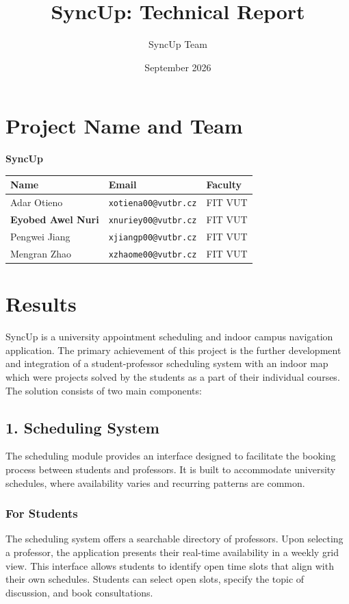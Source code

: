 \documentclass[12pt,a4paper]{article}
\title{\textbf{SyncUp: Technical Report}}
\author{SyncUp Team}
\date{September 2026}
\begin{document}
\maketitle

\section*{Project Name and Team}
\textbf{SyncUp}

\begin{table}[H]
    \centering
    \begin{tabular}{|l|l|l|}
        \hline
        \textbf{Name} & \textbf{Email} & \textbf{Faculty} \\
        \hline
        Adar Otieno & \texttt{xotiena00@vutbr.cz} & FIT VUT \\
        \textbf{Eyobed Awel Nuri} & \texttt{xnuriey00@vutbr.cz} & FIT VUT \\
        Pengwei Jiang & \texttt{xjiangp00@vutbr.cz} & FIT VUT \\
        Mengran Zhao & \texttt{xzhaome00@vutbr.cz} & FIT VUT \\
        \hline
    \end{tabular}
\end{table}

\section*{Results}
SyncUp is a university appointment scheduling and indoor campus navigation application. The primary achievement of this project is the further development and integration of a student-professor scheduling system with an indoor map which were projects solved by the students as a part of their individual courses. The solution consists of two main components:

\subsection*{1. Scheduling System}
The scheduling module provides an interface designed to facilitate the booking process between students and professors. It is built to accommodate university schedules, where availability varies and recurring patterns are common.

\subsubsection*{For Students}
The scheduling system offers a searchable directory of professors. Upon selecting a professor, the application presents their real-time availability in a weekly grid view. This interface allows students to identify open time slots that align with their own schedules. Students can select open slots, specify the topic of discussion, and book consultations.
\end{document}
